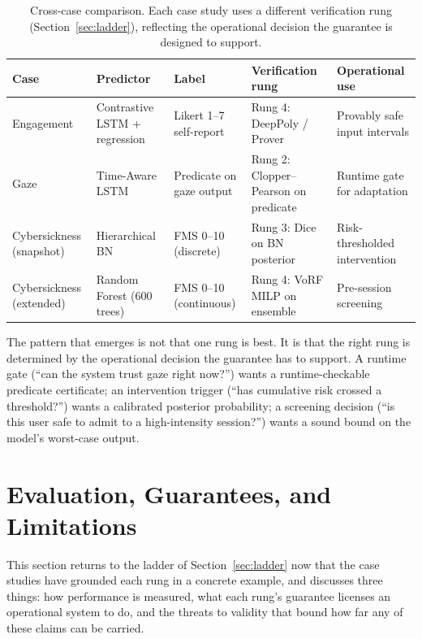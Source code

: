 \documentclass[graybox]{svmult}
\begin{document}
\begin{table}[t]
\centering
\caption{Cross-case comparison. Each case study uses a different verification rung (Section~\ref{sec:ladder}), reflecting the operational decision the guarantee is designed to support.}
\label{tab:cross}
\footnotesize
\setlength{\tabcolsep}{3pt}
\begin{tabular}{p{1.7cm}p{2.1cm}p{1.9cm}p{2.3cm}p{2.2cm}}
\hline
\textbf{Case} & \textbf{Predictor} & \textbf{Label} & \textbf{Verification rung} & \textbf{Operational use}\\
\hline
Engagement & Contrastive LSTM + regression & Likert 1--7 self-report & Rung 4: DeepPoly / Prover & Provably safe input intervals\\
Gaze & Time-Aware LSTM & Predicate on gaze output & Rung 2: Clopper--Pearson on predicate & Runtime gate for adaptation\\
Cybersickness (snapshot) & Hierarchical BN & FMS 0--10 (discrete) & Rung 3: Dice on BN posterior & Risk-thresholded intervention\\
Cybersickness (extended) & Random Forest (600 trees) & FMS 0--10 (continuous) & Rung 4: VoRF MILP on ensemble & Pre-session screening\\
\hline
\end{tabular}
\end{table}

The pattern that emerges is not that one rung is best. It is that the right rung is determined by the operational decision the guarantee has to support. A runtime gate (``can the system trust gaze right now?'') wants a runtime-checkable predicate certificate; an intervention trigger (``has cumulative risk crossed a threshold?'') wants a calibrated posterior probability; a screening decision (``is this user safe to admit to a high-intensity session?'') wants a sound bound on the model's worst-case output.

\section{Evaluation, Guarantees, and Limitations}
\label{sec:evaluation}

This section returns to the ladder of Section~\ref{sec:ladder} now that the case studies have grounded each rung in a concrete example, and discusses three things: how performance is measured, what each rung's guarantee licenses an operational system to do, and the threats to validity that bound how far any of these claims can be carried.
\end{document}
